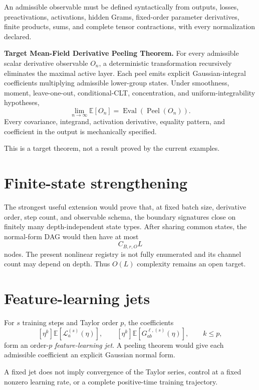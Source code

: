 \documentclass[11pt,oneside]{report}
\begin{document}
An admissible observable must be defined syntactically from outputs, losses,
preactivations, activations, hidden Grams, fixed-order parameter derivatives,
finite products, sums, and complete tensor contractions, with every
normalization declared.

\begin{statusbox}
\textbf{Target Mean-Field Derivative Peeling Theorem.}
For every admissible scalar derivative observable $O_n$, a deterministic
transformation recursively eliminates the maximal active layer.  Each peel
emits explicit Gaussian-integral coefficients multiplying admissible
lower-group states.  Under smoothness, moment, leave-one-out,
conditional-CLT, concentration, and uniform-integrability hypotheses,
\[
\lim_{n\to\infty}\mathbb E[O_n]
=\operatorname{Eval}(\operatorname{Peel}(O_n)).
\]
Every covariance, integrand, activation derivative, equality pattern, and
coefficient in the output is mechanically specified.
\end{statusbox}

This is a target theorem, not a result proved by the current examples.

\section{Finite-state strengthening}

The strongest useful extension would prove that, at fixed batch size,
derivative order, step count, and observable schema, the boundary signatures
close on finitely many depth-independent state types.  After sharing common
states, the normal-form DAG would then have at most
\[
C_{B,r,O}L
\]
nodes.  The present nonlinear registry is not fully enumerated and its channel
count may depend on depth.  Thus $O(L)$ complexity remains an open target.

\section{Feature-learning jets}

For $s$ training steps and Taylor order $p$, the coefficients
\[
[\eta^k]\mathbb E[\mathcal L_a^{(s)}(\eta)],
\qquad
[\eta^k]\mathbb E[G_{ab}^{\ell,(s)}(\eta)],
\qquad k\le p,
\]
form an order-$p$ \emph{feature-learning jet}.  A peeling theorem would give
each admissible coefficient an explicit Gaussian normal form.

\begin{warningbox}
A fixed jet does not imply convergence of the Taylor series, control at a
fixed nonzero learning rate, or a complete positive-time training trajectory.
\end{warningbox}
\end{document}
